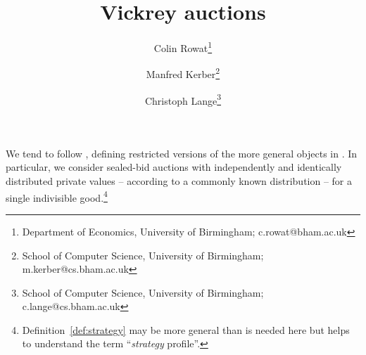 \documentclass[12pt,a4paper]{scrartcl}
\theoremstyle{remark} %
\begin{document}
\title{Vickrey auctions}

\author{
  Colin Rowat\footnote{Department of Economics, University of Birmingham; c.rowat@bham.ac.uk}
  \and Manfred Kerber\footnote{School of Computer Science, University of Birmingham; m.kerber@cs.bham.ac.uk}
  \and Christoph Lange\footnote{School of Computer Science, University of Birmingham; c.lange@cs.bham.ac.uk}
}

\maketitle

We tend to follow \cite[\S3]{mas-04}, defining restricted versions of the more general objects in \cite{mil-04}.  In particular, we consider sealed-bid auctions with independently and identically distributed private values -- according to a commonly known distribution -- for a single indivisible good.\footnote{Definition~\ref{def:strategy} may be more general than is needed here but helps to understand the term ``\emph{strategy} profile''.}

\end{document}
